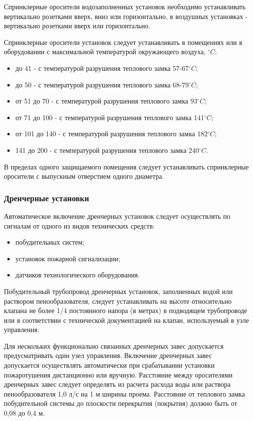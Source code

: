 Спринклерные оросители водозаполненных установок необходимо устанавливать вертикально розетками вверх, вниз или горизонтально,
в воздушных установках - вертикально розетками вверх или горизонтально.

Спринклерные оросители установок следует устанавливать в помещениях или в оборудовании с максимальной температурой окружающего воздуха,
${^\circ{C}}$:
\begin{itemize}
\item до 41 - с температурой разрушения теплового замка 57-67${^\circ{C}}$;
\item до 50 - с температурой разрушения теплового замка 68-79${^\circ{C}}$;
\item от 51 до 70 - с температурой разрушения теплового замка 93${^\circ{C}}$;
\item от 71 до 100 - с температурой разрушения теплового замка 141${^\circ{C}}$;
\item от 101 до 140 - с температурой разрушения теплового замка 182${^\circ{C}}$;
\item 141 до 200 - с температурой разрушения теплового замка 240${^\circ{C}}$.
\end{itemize}

В пределах одного защищаемого помещения следует устанавливать спринклерные оросители с выпускным отверстием одного диаметра.

\subsubsection{Дренчерные установки}
Автоматическое включение дренчерных установок следует осуществлять по сигналам от одного из видов технических средств:
\begin{itemize}
\item побудительных систем;
\item установок пожарной сигнализации;
\item датчиков технологического оборудования.
\end{itemize}

Побудительный трубопровод дренчерных установок, заполненных водой или раствором пенообразователя, следует устанавливать на
высоте относительно клапана не более 1/4 постоянного напора (в метрах) в подводящем трубопроводе или в соответствии с
технической документацией на клапан, используемый в узле управления.

Для нескольких функционально связанных дренчерных завес допускается предусматривать один узел управления.
Включение дренчерных завес допускается осуществлять автоматически при срабатывании установки пожаротушения
дистанционно или вручную. Расстояние между оросителями дренчерных завес следует определять из расчета расхода
воды или раствора пенообразователя 1,0 л/с на 1 м ширины проема. Расстояние от теплового замка побудительной системы
до плоскости перекрытия (покрытия) должно быть от 0,08 до 0,4 м.

